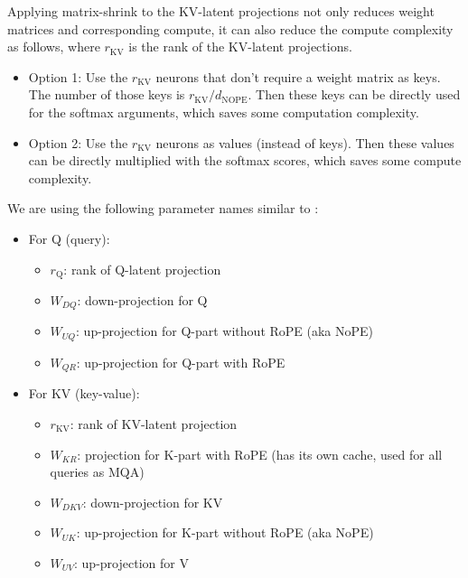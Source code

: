 \documentclass{article}
\begin{document}
Applying matrix-shrink to the KV-latent projections not only reduces weight matrices and corresponding compute, it can also reduce the compute complexity as follows, where $r_\text{KV}$ is the rank of the KV-latent projections.
\begin{itemize}[topsep=-1pt, itemsep=-1pt]
  \item Option 1: Use the $r_\text{KV}$ neurons that don’t require a weight matrix as keys. The number of those keys is $r_\text{KV} / d_\text{NOPE}$. Then these keys can be directly used for the softmax arguments, which saves some computation complexity.
  \item Option 2: Use the $r_\text{KV}$ neurons as values (instead of keys). Then these values can be directly multiplied with the softmax scores, which saves some compute complexity.
\end{itemize}

We are using the following parameter names similar to \citep{deepseek-v2}:
\begin{itemize}[topsep=-1pt, itemsep=-1pt]
  \item For Q (query):
  \begin{itemize}[topsep=-1pt, itemsep=-1pt]
    \item $r_\text{Q}$: rank of Q-latent projection
    \item $W_{DQ}$: down-projection for Q
    \item $W_{UQ}$: up-projection for Q-part without RoPE (aka NoPE)
    \item $W_{QR}$: up-projection for Q-part with RoPE
  \end{itemize}
  \item For KV (key-value):
  \begin{itemize}[topsep=-1pt, itemsep=-1pt]
    \item $r_\text{KV}$: rank of KV-latent projection
    \item $W_{KR}$: projection for K-part with RoPE (has its own cache, used for all queries as MQA)
    \item $W_{DKV}$: down-projection for KV
    \item $W_{UK}$: up-projection for K-part without RoPE (aka NoPE)
    \item $W_{UV}$: up-projection for V
  \end{itemize}
\end{itemize}

\def\dsRone     {\href{https://huggingface.co/deepseek-ai/DeepSeek-R1}         {DeepSeek-R1}}
\def\dsVthree   {\href{https://huggingface.co/deepseek-ai/DeepSeek-V3}         {V3}}
\def\dsVtwoFive {\href{https://huggingface.co/deepseek-ai/DeepSeek-V2.5}       {DeepSeek-V2.5}}
\def\dsVtwoL    {\href{https://huggingface.co/deepseek-ai/DeepSeek-V2-Lite}    {DeepSeek-V2-lite}}
\def\MiniCPM    {\href{https://huggingface.co/openbmb/MiniCPM3-4B}             {MiniCPM3-4B}}
\end{document}
